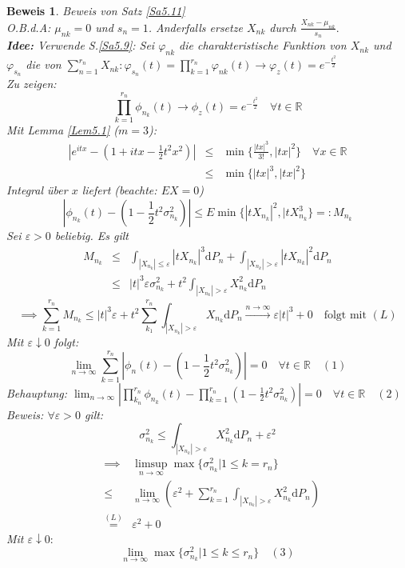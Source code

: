 \documentclass[a4paper,11pt]{book}
\newcommand{\R}{{\mathbb R}}
\newcommand{\eps}{\varepsilon}
\def\folgt{\ensuremath{\implies}}
\def\d{\mbox{d}}
\theoremstyle{nonumberplain}
\newtheorem{Bew}{Beweis}
\begin{document}
\begin{Bew}
Beweis von Satz \ref{Sa5.11} \\
O.B.d.A: $\mu_{nk}=0$ und $s_n=1$. Anderfalls ersetze $X_{nk}$ durch $\frac{X_{nk}-\mu_{nk}}{s_n}.$\\
\textbf{Idee:} Verwende S.\ref{Sa5.9}: Sei $\varphi_{nk}$ die charakteristische Funktion von $X_{nk}$ und $\varphi_{s_n}$ die von $\sum_{n=1}^{r_n} X_{nk}: \varphi_{s_n}(t) = \prod_{k=1}^{r_n} \varphi_{nk}(t) \rightarrow \varphi_z(t) = e^{-\frac{t^2}{2}}$ \\
Zu zeigen:
$$\prod^{r_n}_{k=1}\phi_{n_k}(t)\to\phi_z(t)=e^{-\frac {t^2} 2}\quad\forall t\in\R$$
Mit Lemma \ref{Lem5.1} ($m=3$):
\begin{eqnarray*}
\left| e^{itx} - (1+itx-\frac 1 2 t^2 x^2)\right| &\le&\min\{\frac{|tx|^3}{3!}, |tx|^2\}\quad\forall x\in\R\\
&\le&\min\{|tx|^3, |tx|^2\}
\end{eqnarray*}
Integral über $x$ liefert (beachte: $EX=0$)
$$\left|\phi_{n_k}(t) - ( 1- \frac 1 2 t^2\sigma_{n_k}^2)\right|\le E\min\{|tX_{n_k}|^2, |tX_{n_k}^3\} =: M_{n_k}$$
Sei $\eps>0$ beliebig. Es gilt
\begin{eqnarray*}
M_{n_k} &\le& \int_{|X_{n_k}|\le\eps}|tX_{n_k}|^3\d P_n + \int_{|X_{n_k}|>\eps}|tX_{n_k}|^2\d P_n\\
&\le& |t|^3\eps\sigma_{n_k}^2 + t^2\int_{|X_{n_k}|>\eps}X_{n_k}^2\d P_n
\end{eqnarray*}
$$\folgt\sum_{k=1}^{r_n}M_{n_k}\le|t|^3\eps + t^2\sum_{k_1}^{r_n}\int_{|X_{n_k}|>\eps}X_{n_k}\d P_n \stackrel{n\to\infty}{\to}\eps|t|^3 + 0 \quad\text{folgt mit }(L)$$
Mit $\eps\downarrow 0$ folgt:
$$\lim_{n\to\infty}\sum_{k=1}^{r_n}\left|\phi_n(t)-(1-\frac 1 2 t^2\sigma_{n_k}^2)\right| = 0 \quad\forall t\in\R\quad (1)$$
Behauptung: $\lim_{n\to\infty}\left|\prod_{k_n}^{r_n}\phi_{n_k}(t) - \prod_{k=1}^{r_n}(1-\frac 1 2 t^2\sigma_{n_k}^2)\right|=0\quad\forall t\in\R\quad (2)$\\
Beweis: $\forall\eps>0$ gilt:
$$\sigma_{n_k}^2\le\int_{|X_{n_k}|>\eps}X_{n_k}^2\d P_n + \eps^2$$
\begin{eqnarray*}
&\folgt& \limsup_{n\to\infty}\max\{\sigma_{n_k}^2|1\le k=r_n\} \\
&\le&\lim_{n\to\infty}\left(\eps^2+\sum_{k=1}^{r_n}\int_{|X_{n_k}|>\eps}X_{n_k}^2\d P_n\right)\\
&\stackrel{(L)}{=}&\eps^2 + 0
\end{eqnarray*}
Mit $\eps\downarrow 0:$
$$\lim_{n\to\infty}\max\{\sigma_{n_k}^2|1\le k\le r_n\}\quad (3)$$
\begin{tabular}[b]{rp{}}

\end{tabular}
\end{Bew}
\end{document}
